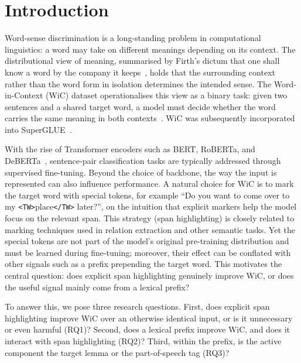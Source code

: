 \documentclass[runningheads]{llncs}
\begin{document}
\section{Introduction}
\label{sec:intro}

Word-sense discrimination is a long-standing problem in computational
linguistics: a word may take on different meanings depending on its context.
The distributional view of meaning, summarised by Firth's dictum that one shall
know a word by the company it keeps~\cite{firth1957synopsis}, holds that the
surrounding context rather than the word form in isolation determines the
intended sense. The Word-in-Context (WiC)
dataset operationalises this view as a binary task: given two sentences and a
shared target word, a model must decide whether the word carries the same
meaning in both contexts~\cite{pilehvar2019wic}. WiC was subsequently
incorporated into SuperGLUE~\cite{wang2019superglue}.

With the rise of Transformer encoders such as BERT, RoBERTa, and
DeBERTa~\cite{devlin2019bert,liu2019roberta,he2021deberta}, sentence-pair
classification tasks are typically addressed through supervised fine-tuning.
Beyond the choice of backbone, the way the input is represented can also
influence performance. A natural choice for WiC is to mark the target word with
special tokens, for example ``Do you want to come over to my
\texttt{<TW>}place\texttt{</TW>} later?'', on the intuition that explicit
markers help the model focus on the relevant span. This strategy (span
highlighting) is closely related to marking techniques used in relation
extraction and other semantic tasks. Yet the
special tokens are not part of the model's original pre-training distribution
and must be learned during fine-tuning; moreover, their effect can be conflated
with other signals such as a prefix prepending the target word. This motivates
the central question: does explicit span highlighting genuinely improve WiC, or
does the useful signal mainly come from a lexical prefix?

To answer this, we pose three research questions. First, does explicit span
highlighting improve WiC over an otherwise identical input, or is it unnecessary
or even harmful (RQ1)? Second, does a lexical prefix improve WiC, and does it
interact with span highlighting (RQ2)? Third, within the prefix, is the active
component the target lemma or the part-of-speech tag (RQ3)?
\end{document}
